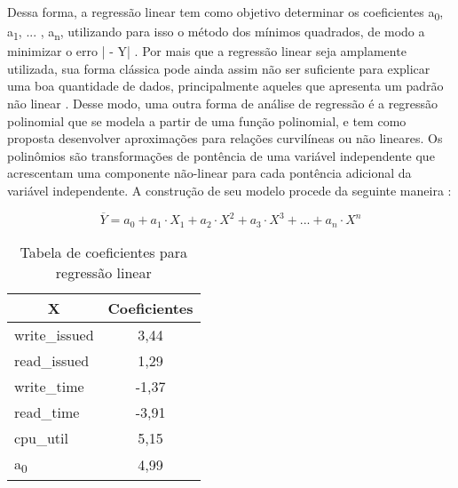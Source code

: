 Dessa forma, a regressão linear tem como objetivo determinar os coeficientes
a\textsubscript{0}, a\textsubscript{1}, ... , a\textsubscript{n}, utilizando
para isso o método dos mínimos quadrados, de modo a minimizar o erro
| - Y| \cite{koh2007}. Por mais que a regressão linear seja
amplamente utilizada, sua forma clássica pode ainda assim não ser suficiente
para explicar uma boa quantidade de dados, principalmente aqueles que apresenta
um padrão não linear \cite{pantula}. Desse modo, uma outra forma de análise de
regressão é a regressão polinomial que se modela a partir de uma função
polinomial, e tem como proposta desenvolver aproximações para relações
curvilíneas ou não lineares. Os polinômios são transformações de pontência de
uma variável independente que acrescentam uma componente não-linear para cada
pontência adicional da variável independente. A construção de seu modelo
procede da seguinte maneira \cite{hair}:

\begin{equation}
\label{eq:polinomio} 
 \overline{Y} = a_0 + a_1 \cdot X_1 + a_2 \cdot X^2 + a_3 \cdot X^3 + ... + a_n \cdot X^n
\end{equation}

\begin{table}[!htb]
\centering
\caption{Tabela de coeficientes para regressão linear}
\label{tab:coeficiente_linear}
\begin{tabular}{|l|c|}
\hline
\multicolumn{1}{|c|}{X}   & \multicolumn{1}{l|}{Coeficientes} \\ \hline
write\_issued & 3,44                             \\ \hline
read\_issued  & 1,29                             \\ \hline
write\_time   & -1,37                            \\ \hline
read\_time    & -3,91                            \\ \hline
cpu\_util     & 5,15                             \\ \hline
a\textsubscript{0}           & 4,99                             \\ \hline
\end{tabular}
\end{table}

